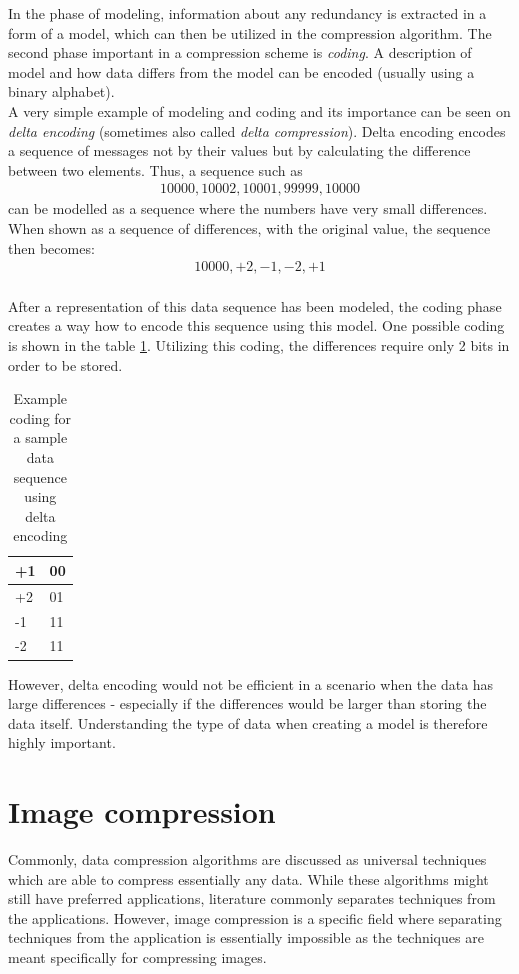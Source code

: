 \documentclass[thesis=M,english]{FITthesis}[2012/10/20]
\begin{document}
In the phase of modeling, information about any redundancy is extracted in a form
of a model, which can then be utilized in the compression algorithm. The second phase
important in a compression scheme is \emph{coding}. A description of model and how
data differs from the model can be encoded (usually using a binary alphabet).\cite{datacompression}
\\

A very simple example of modeling and coding and its importance can be seen on \emph{delta
encoding} (sometimes also called \emph{delta compression}). Delta encoding encodes
a sequence of messages not by their values but by calculating the difference
between two elements.\cite{signalprocessing} Thus, a sequence such as
\begin{align*}
  10000, 10002, 10001, 99999, 10000
\end{align*}
can be modelled as a sequence where the numbers have very small differences.
When shown as a sequence of differences, with the original value, the sequence
then becomes:
\begin{align*}
  10000, +2, -1, -2, +1
\end{align*}
\\

After a representation of this data sequence has been modeled, the coding phase
creates a way how to encode this sequence using this model. One possible
coding is shown in the table \ref{tab:deltacoding}. Utilizing this coding, the
differences require only 2 bits in order to be stored.
\\

\begin{table}[]
\centering
\begin{tabular}{|l|l|}
\hline
+1 & 00 \\ \hline
+2 & 01 \\ \hline
-1 & 11 \\ \hline
-2 & 11 \\ \hline
\end{tabular}
\caption{Example coding for a sample data sequence using delta encoding}
\label{tab:deltacoding}
\end{table}

However, delta encoding would not be efficient in a scenario when
the data has large differences - especially if the differences would be larger
than storing the data itself. Understanding the type of data when creating a model
is therefore highly important.


\section{Image compression}
Commonly, data compression algorithms are discussed as universal techniques
which are able to compress essentially any data. While these algorithms might still
have preferred applications, literature commonly separates techniques from the applications.
However, image compression is a specific field where separating techniques from
the application is essentially impossible as the techniques are meant specifically
for compressing images.\cite{datacompression}
\\
\end{document}
